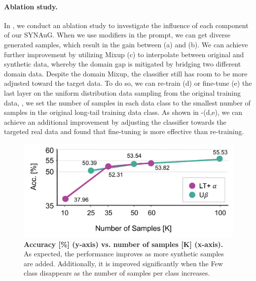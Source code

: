 \paragraph{Ablation study.}
In , we conduct an ablation study to investigate the influence of each component of our SYNAuG.
When we use modifiers in the prompt, we can get diverse generated samples, which result in the gain between (a) and (b).
We can achieve further improvement by utilizing Mixup (c) to interpolate between original and synthetic data, whereby the domain gap is mitigated by bridging two different domain data.
Despite the domain Mixup, 
the classifier still has room to be more adjusted toward the target data.
To do so, we can re-train (d) or fine-tune (e) the last layer on the uniform distribution data sampling from the original training data, \ie, we set the number of samples in each data class to the smallest number of samples in the original long-tail training data class.
As shown in -(d,e),
we can achieve an additional improvement by adjusting the classifier towards the targeted real data and found that fine-tuning is more effective than re-training.




\begin{figure}
    \centering
    \includegraphics[width=0.95\linewidth]{figures/num_data.pdf}
    \caption{\textbf{Accuracy [\%] (y-axis) vs. number of samples [K] (x-axis).}
    As expected, the performance improves as more synthetic samples are added.
    Additionally, it is improved significantly when the Few class disappears as the number of samples per class increases.}
    \label{fig:alleviate}
\end{figure}



